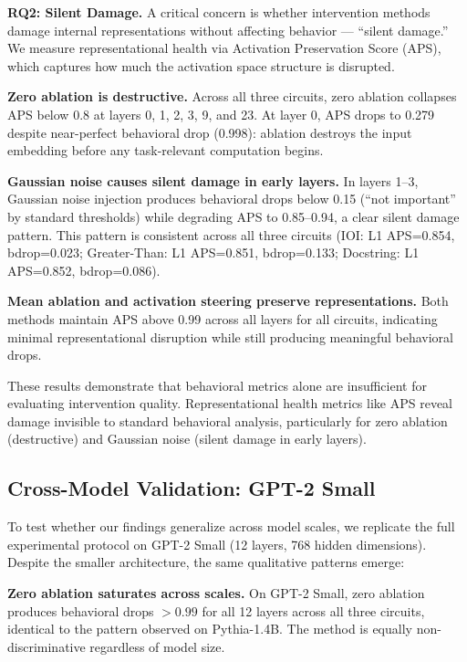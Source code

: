 \documentclass[pdflatex,sn-mathphys-num]{sn-jnl}
\begin{document}
\textbf{RQ2: Silent Damage.}
A critical concern is whether intervention methods damage internal representations without affecting behavior --- ``silent damage.''
We measure representational health via Activation Preservation Score (APS), which captures how much the activation space structure is disrupted.

\textbf{Zero ablation is destructive.}
Across all three circuits, zero ablation collapses APS below 0.8 at layers 0, 1, 2, 3, 9, and 23. At layer 0, APS drops to 0.279 despite near-perfect behavioral drop (0.998): ablation destroys the input embedding before any task-relevant computation begins.

\textbf{Gaussian noise causes silent damage in early layers.}
In layers 1--3, Gaussian noise injection produces behavioral drops below 0.15 (``not important'' by standard thresholds) while degrading APS to 0.85--0.94, a clear silent damage pattern.
This pattern is consistent across all three circuits (IOI: L1 APS=0.854, bdrop=0.023; Greater-Than: L1 APS=0.851, bdrop=0.133; Docstring: L1 APS=0.852, bdrop=0.086).

\textbf{Mean ablation and activation steering preserve representations.}
Both methods maintain APS above 0.99 across all layers for all circuits, indicating minimal representational disruption while still producing meaningful behavioral drops.

These results demonstrate that behavioral metrics alone are insufficient for evaluating intervention quality.
Representational health metrics like APS reveal damage invisible to standard behavioral analysis, particularly for zero ablation (destructive) and Gaussian noise (silent damage in early layers).

\subsection{Cross-Model Validation: GPT-2 Small}
\label{sec:cross-model}

To test whether our findings generalize across model scales, we replicate the full experimental protocol on GPT-2 Small (12 layers, 768 hidden dimensions). Despite the smaller architecture, the same qualitative patterns emerge:

\textbf{Zero ablation saturates across scales.} On GPT-2 Small, zero ablation produces behavioral drops $> 0.99$ for all 12 layers across all three circuits, identical to the pattern observed on Pythia-1.4B. The method is equally non-discriminative regardless of model size.
\end{document}
